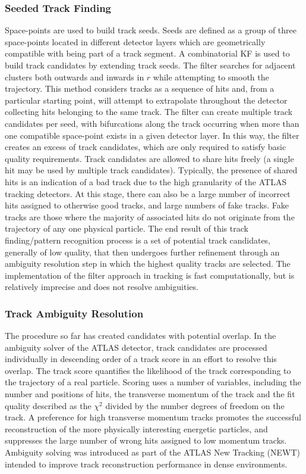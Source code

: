 \subsubsection{Seeded Track Finding}
Space-points are used to build track seeds. Seeds are defined as a group of three space-points located in different detector layers which are geometrically compatible with being part of a track segment. A combinatorial KF is used to build track candidates by extending track seeds. The filter searches for adjacent clusters both outwards and inwards in $r$ while attempting to smooth the trajectory. This method considers tracks as a sequence of hits and, from a particular starting point, will attempt to extrapolate throughout the detector collecting hits belonging to the same track. The filter can create multiple track candidates per seed, with bifurcations along the track occurring when more than one compatible space-point exists in a given detector layer. In this way, the filter creates an excess of track candidates, which are only required to satisfy basic quality requirements. Track candidates are allowed to share hits freely (a single hit may be used by multiple track candidates). Typically, the presence of shared hits is an indication of a bad track due to the high granularity of the ATLAS tracking detectors. At this stage, there can also be a large number of incorrect hits assigned to otherwise good tracks, and large numbers of fake tracks. Fake tracks are those where the majority of associated hits do not originate from the trajectory of any one physical particle. The end result of this track finding/pattern recognition process is a set of potential track candidates, generally of low quality, that then undergoes further refinement through an ambiguity resolution step in which the highest quality tracks are selected. The implementation of the filter approach in tracking is fast computationally, but is relatively imprecise and does not resolve ambiguities.

\subsubsection{Track Ambiguity Resolution}
\label{chapter-3-ambiguity-resolution}

The procedure so far has created candidates with potential overlap. In the ambiguity solver of the ATLAS detector, track candidates are processed individually in descending order of a track score in an effort to resolve this overlap. The track score quantifies the likelihood of the track corresponding to the trajectory of a real particle. Scoring uses a number of variables, including the number and positions of hits, the transverse momentum of the track and the fit quality described as the $\chi^{2}$ divided by the number degrees of freedom on the track. A preference for high transverse momentum tracks promotes the successful reconstruction of the more physically interesting energetic particles, and suppresses the large number of wrong hits assigned to low momentum tracks. Ambiguity solving was introduced as part of the ATLAS New Tracking (NEWT) \cite{Cornelissen:2007vba} intended to improve track reconstruction performance in dense environments. 

